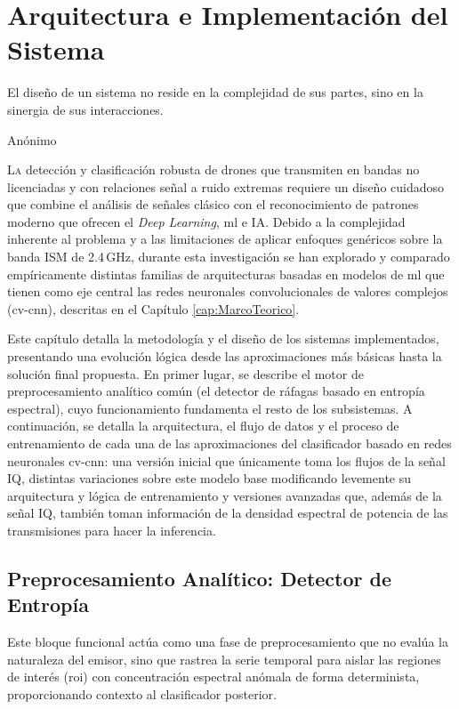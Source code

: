 \chapter{Arquitectura e Implementación del Sistema}
\label{ch:arquitectura}

\epigraph{El diseño de un sistema no reside en la complejidad de sus partes, sino en la sinergia de sus interacciones.}{Anónimo}

\lettrine[lraise=-0.1, lines=2, loversize=0.2]{L}{a} detección y clasificación robusta de drones que transmiten en bandas no licenciadas y con relaciones señal a ruido extremas requiere un diseño cuidadoso que combine el análisis de señales clásico con el reconocimiento de patrones moderno que ofrecen el \textit{Deep Learning}, \gls{ml} e IA. Debido a la complejidad inherente al problema y a las limitaciones de aplicar enfoques genéricos sobre la banda ISM de 2.4\,GHz, durante esta investigación se han explorado y comparado empíricamente distintas familias de arquitecturas basadas en modelos de \gls{ml} que tienen como eje central las redes neuronales convolucionales de valores complejos (\gls{cv-cnn}), descritas en el Capítulo \ref{cap:MarcoTeorico}. 

Este capítulo detalla la metodología y el diseño de los sistemas implementados, presentando una evolución lógica desde las aproximaciones más básicas hasta la solución final propuesta. En primer lugar, se describe el motor de preprocesamiento analítico común (el detector de ráfagas basado en entropía espectral), cuyo funcionamiento fundamenta el resto de los subsistemas. A continuación, se detalla la arquitectura, el flujo de datos y el proceso de entrenamiento de cada una de las aproximaciones del clasificador basado en redes neuronales \gls{cv-cnn}: una versión inicial que únicamente toma los flujos de la señal IQ, distintas variaciones sobre este modelo base modificando levemente su arquitectura y lógica de entrenamiento y versiones avanzadas que, además de la señal IQ, también toman información de la densidad espectral de potencia de las transmisiones para hacer la inferencia. 

\section{Preprocesamiento Analítico: Detector de Entropía}
\label{sec:preprocesamiento_analitico}

Este bloque funcional actúa como una fase de preprocesamiento que no evalúa la naturaleza del emisor, sino que rastrea la serie temporal para aislar las regiones de interés (\gls{roi}) con concentración espectral anómala de forma determinista, proporcionando contexto al clasificador posterior.

